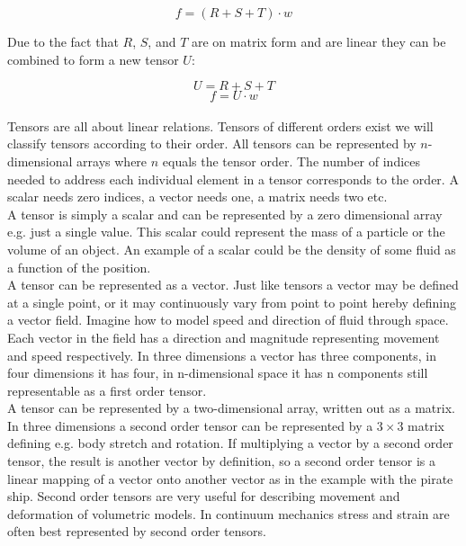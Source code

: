 \begin{equation}
f = (R + S + T) \cdot w
\end{equation}

Due to the fact that $R$, $S$, and $T$ are on matrix form and are
linear they can be combined to form a new tensor $U$:

\begin{equation}
U = R + S + T
\end{equation}  
\begin{equation}
f = U \cdot w
\end{equation} \\

Tensors are all about linear relations. Tensors of different orders
exist we will classify tensors according to
their order. All tensors can be represented by $n$-dimensional
arrays where $n$ equals the tensor order. The number of indices needed to 
address each individual element in a tensor corresponds to the order. A
scalar needs zero indices, a vector needs one, a matrix needs two
etc. \\

A  tensor is simply a scalar and can be represented by a
zero dimensional array e.g. just a single value. This scalar could
represent the mass of a particle or the volume of an object. An
example of a scalar could be the density of some fluid as a
function of the position. \\

A  tensor can be represented as
a vector. Just like tensors a vector may be
defined at a single point, or it may continuously vary from point to
point hereby defining a vector field. Imagine how to model speed and
direction of fluid through space. Each vector in the field has a
direction and magnitude representing movement and speed
respectively. In three dimensions a vector has three components, in
four dimensions it has four, in n-dimensional space it has n
components still representable as a first order tensor. \\

A  tensor can be represented by a two-dimensional array,
written out as a matrix. In three dimensions a second order tensor
can be represented by a $3 \times 3$ matrix defining e.g. body stretch and
rotation. If multiplying a vector by a second order tensor, the result
is another vector by definition, so a second order tensor is a linear mapping of a
vector onto another vector as in the example with the pirate
ship. Second order tensors are very useful for describing movement and
deformation of volumetric models. In continuum mechanics stress and
strain are often best represented by second order tensors. \\ 


